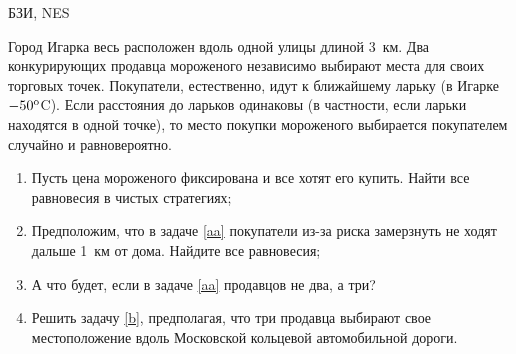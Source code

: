 \begin{problem}
\begin{source}
БЗИ, NES
\end{source} Город Игарка весь
расположен вдоль одной улицы длиной 3~км. Два конкурирующих
продавца мороженого независимо выбирают места для своих
торговых точек. Покупатели, естественно, идут к ближайшему
ларьку (в Игарке $-50^{\rm o}$C). Если расстояния до
ларьков одинаковы (в частности, если ларьки находятся в
одной точке), то место покупки мороженого выбирается
покупателем случайно и равновероятно.

\begin{enumerate}

\item\label{aa} Пусть цена мороженого фиксирована и все
хотят его купить. Найти все равновесия в чистых стратегиях;

\item Предположим, что в задаче \ref{aa} покупатели из-за
риска замерзнуть не ходят дальше 1~км от дома. Найдите все
равновесия;

\item\label{b} А что будет, если в задаче \ref{aa}
продавцов не два, а три?

\item Решить задачу \ref{b}, предполагая, что три продавца
выбирают свое местоположение вдоль Московской кольцевой
автомобильной дороги.

\end{enumerate}

\begin{sol}

\end{sol}
\end{problem}






